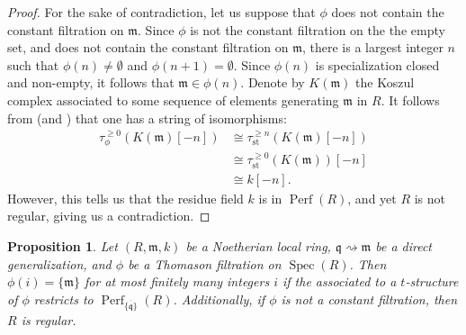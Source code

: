 \documentclass[11pt]{amsart}
\theoremstyle{plain}
\newtheorem{proposition}[theorem]{Proposition}
\theoremstyle{definition}
\numberwithin{equation}{section}
\numberwithin{theorem}{section}
\begin{document}
\begin{proof}
    For the sake of contradiction, let us suppose that $\phi$ does not contain the constant filtration on $\mathfrak{m}$. Since $\phi$ is not the constant filtration on the the empty set, and does not contain the constant filtration on $\mathfrak{m}$, there is a largest integer $n$ such that $\phi(n) \ne \emptyset$ and $\phi(n+1) = \emptyset$. Since $\phi(n)$ is specialization closed and non-empty, it follows that $\mathfrak{m}\in \phi(n)$. Denote by $K(\mathfrak{m})$ the Koszul complex associated to some sequence of elements generating $\mathfrak{m}$ in $R$. It follows from  (and ) that one has a string of isomorphisms:
    \begin{displaymath}
        \begin{aligned}
            \tau^{\geq 0}_\phi (K(\mathfrak{m})[-n]) 
            &\cong \tau^{\geq n}_{\operatorname{st}}(K(\mathfrak{m})[-n]) \\&\cong \tau^{\geq 0}_{\operatorname{st}}(K(\mathfrak{m}))[-n]
            \\& \cong k[-n].
        \end{aligned}
    \end{displaymath}
    However, this tells us that the residue field $k$ is in $\operatorname{Perf}(R)$, and yet $R$ is not regular, giving us a contradiction.
\end{proof}

\begin{proposition}\label{prop:reduce_to_almost_curves}
    Let $(R,\mathfrak{m},k)$ be a Noetherian local ring, $\mathfrak{q}\rightsquigarrow \mathfrak{m}$ be a direct generalization, 
    and $\phi$ be a Thomason filtration on $\operatorname{Spec}(R)$. Then $\phi(i) = \{\mathfrak{m}\}$ for at most finitely many integers $i$ if the associated to a $t$-structure of $\phi$ restricts to $\operatorname{Perf}_{\overline{\{ \mathfrak{q}\} }}(R)$. Additionally, if $\phi$ is not a constant filtration, then $R$ is regular.
\end{proposition}
\end{document}
